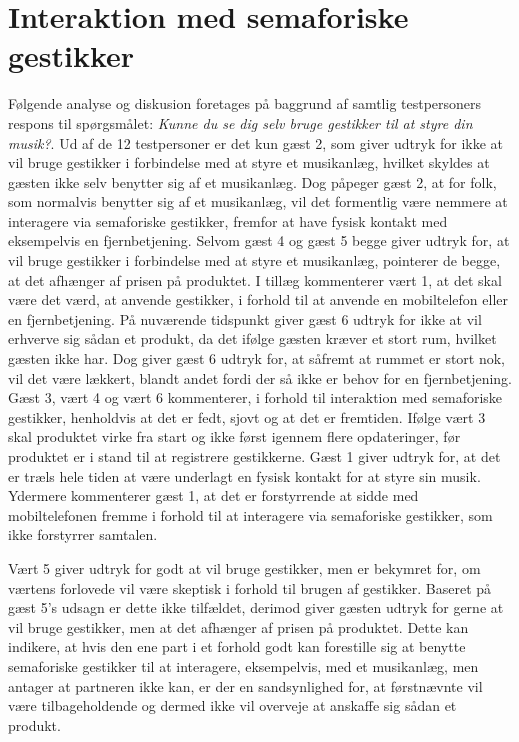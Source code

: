\section{Interaktion med semaforiske gestikker}
\label{TestresultaterSocialAcceptBrug}
%
Følgende analyse og diskusion foretages på baggrund af samtlig testpersoners respons til spørgsmålet: \textit{Kunne du se dig selv bruge gestikker til at styre din musik?}. \blankline
%
Ud af de 12 testpersoner er det kun gæst 2, som giver udtryk for ikke at vil bruge gestikker i forbindelse med at styre et musikanlæg, hvilket skyldes at gæsten ikke selv benytter sig af et musikanlæg. Dog påpeger gæst 2, at for folk, som normalvis benytter sig af et musikanlæg, vil det formentlig være nemmere at interagere via semaforiske gestikker, fremfor at have fysisk kontakt med eksempelvis en fjernbetjening. Selvom gæst 4 og gæst 5 begge giver udtryk for, at vil bruge gestikker i forbindelse med at styre et musikanlæg, pointerer de begge, at det afhænger af prisen på produktet. I tillæg kommenterer vært 1, at det skal være det værd, at anvende gestikker, i forhold til at anvende en mobiltelefon eller en fjernbetjening. På nuværende tidspunkt giver gæst 6 udtryk for ikke at vil erhverve sig sådan et produkt, da det ifølge gæsten kræver et stort rum, hvilket gæsten ikke har. Dog giver gæst 6 udtryk for, at såfremt at rummet er stort nok, vil det være lækkert, blandt andet fordi der så ikke er behov for en fjernbetjening. Gæst 3, vært 4 og vært 6 kommenterer, i forhold til interaktion med semaforiske gestikker, henholdvis at det er fedt, sjovt og at det er fremtiden. Ifølge vært 3 skal produktet virke fra start og ikke først igennem flere opdateringer, før produktet er i stand til at registrere gestikkerne. Gæst 1 giver udtryk for, at det er træls hele tiden at være underlagt en fysisk kontakt for at styre sin musik. Ydermere kommenterer gæst 1, at det er forstyrrende at sidde med mobiltelefonen fremme i forhold til at interagere via semaforiske gestikker, som ikke forstyrrer samtalen.

Vært 5 giver udtryk for godt at vil bruge gestikker, men er bekymret for, om værtens forlovede vil være skeptisk i forhold til brugen af gestikker. Baseret på gæst 5's udsagn er dette ikke tilfældet, derimod giver gæsten udtryk for gerne at vil bruge gestikker, men at det afhænger af prisen på produktet. Dette kan indikere, at hvis den ene part i et forhold godt kan forestille sig at benytte semaforiske gestikker til at interagere, eksempelvis, med et musikanlæg, men antager at partneren ikke kan, er der en sandsynlighed for, at førstnævnte vil være tilbageholdende og dermed ikke vil overveje at anskaffe sig sådan et produkt.    

